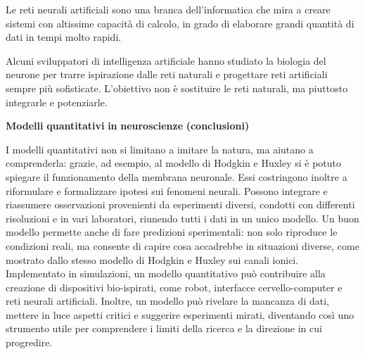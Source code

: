 \documentclass[12pt,a4paper]{book}
\begin{document}
Le reti neurali artificiali sono una branca dell'informatica che mira a creare sistemi con altissime capacità di calcolo, in grado di elaborare grandi quantità di dati in tempi molto rapidi.

Alcuni sviluppatori di intelligenza artificiale hanno studiato la biologia del neurone per trarre ispirazione dalle reti naturali e progettare reti artificiali sempre più sofisticate. L'obiettivo non è sostituire le reti naturali, ma piuttosto integrarle e potenziarle.

\textbf{Modelli}\textbf{ }\textbf{quantitativi}\textbf{ }\textbf{in}\textbf{ }\textbf{neuroscienze}\textbf{ }\textbf{(conclusioni)}

I modelli quantitativi non si limitano a imitare la natura, ma aiutano a comprenderla: grazie, ad esempio, al modello di Hodgkin e Huxley si è potuto spiegare il funzionamento della membrana neuronale. Essi costringono inoltre a riformulare e formalizzare ipotesi sui fenomeni neurali. Possono integrare e riassumere osservazioni provenienti da esperimenti diversi, condotti con differenti risoluzioni e in vari laboratori, riunendo tutti i dati in un unico modello. Un buon modello permette anche di fare predizioni sperimentali: non solo riproduce le condizioni reali, ma consente di capire cosa accadrebbe in situazioni diverse, come mostrato dallo stesso modello di Hodgkin e Huxley sui canali ionici. Implementato in simulazioni, un modello quantitativo può contribuire alla creazione di dispositivi bio-ispirati, come robot, interfacce cervello-computer e reti neurali artificiali. Inoltre, un modello può rivelare la mancanza di dati, mettere in luce aspetti critici e suggerire esperimenti mirati, diventando così uno strumento utile per comprendere i limiti della ricerca e la direzione in cui progredire.
\end{document}
